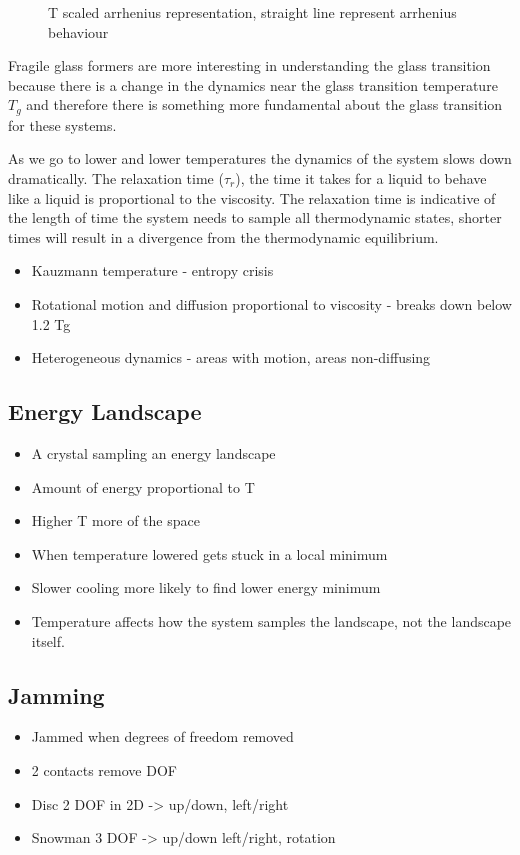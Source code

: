 \begin{figure}
    \caption{T scaled arrhenius representation, straight line represent arrhenius behaviour}
    \label{fig:angell}
\end{figure}

Fragile glass formers are more interesting in understanding the glass transition because there is a change in the dynamics near the glass transition temperature $T_g$ and therefore there is something more fundamental about the glass transition for these systems. 

As we go to lower and lower temperatures the dynamics of the system slows down dramatically. The relaxation time ($\tau_r$), the time it takes for a liquid to behave like a liquid is proportional to the viscosity. The relaxation time is indicative of the length of time the system needs to sample all thermodynamic states, shorter times will result in a divergence from the thermodynamic equilibrium.

\begin{itemize}
    \item Kauzmann temperature - entropy crisis
    \item Rotational motion and diffusion proportional to viscosity - breaks down below 1.2 Tg
    \item Heterogeneous dynamics - areas with motion, areas non-diffusing
\end{itemize}

\subsection{Energy Landscape}

\begin{itemize}
    \item A crystal sampling an energy landscape
    \item Amount of energy proportional to T
    \item Higher T more of the space
    \item When temperature lowered gets stuck in a local minimum
    \item Slower cooling more likely to find lower energy minimum
    \item Temperature affects how the system samples the landscape, not the landscape itself.
\end{itemize}

\subsection{Jamming}
\begin{itemize}
    \item Jammed when degrees of freedom removed
    \item 2 contacts remove DOF
    \item Disc 2 DOF in 2D -> up/down, left/right
    \item Snowman 3 DOF -> up/down left/right, rotation
\end{itemize}
